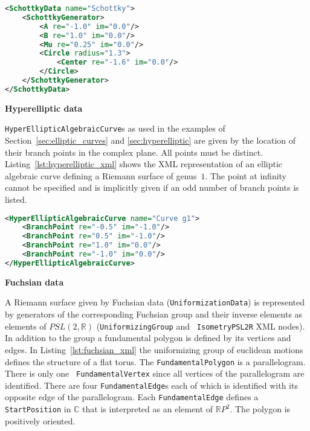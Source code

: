 \documentclass[Thesis.tex]{subfiles}
\begin{document}
\begin{lstlisting}[label=lst:schottky_xml, caption={A torus given by Schottky data}, 
numbers=none, language=XML, captionpos=b]
<SchottkyData name="Schottky">
	<SchottkyGenerator>
		<A re="-1.0" im="0.0"/>
		<B re="1.0" im="0.0"/>
		<Mu re="0.25" im="0.0"/>
		<Circle radius="1.3">
			<Center re="-1.6" im="0.0"/>
		</Circle>
	</SchottkyGenerator>
</SchottkyData>
\end{lstlisting}

{\bf Hyperelliptic data} 

{\tt HyperEllipticAlgebraicCurve}s as used in the examples of
Section~\ref{sec:elliptic_curves} and \ref{sec:hyperelliptic} are
given by the location of their branch points in the complex plane. All points
must be distinct. Listing~\ref{lst:hyperelliptic_xml} shows the XML
representation of an elliptic algebraic curve defining a Riemann surface of
genus~$1$. The point at infinity cannot be specified and is implicitly given if
an odd number of branch points is listed.

\begin{lstlisting}[label=lst:hyperelliptic_xml, caption={A torus given as 
hyperelliptic data}, numbers=none, language=XML, captionpos=b]
<HyperEllipticAlgebraicCurve name="Curve g1">
	<BranchPoint re="-0.5" im="-1.0"/>
	<BranchPoint re="0.5" im="-1.0"/>
	<BranchPoint re="1.0" im="0.0"/>
	<BranchPoint re="-1.0" im="0.0"/>
</HyperEllipticAlgebraicCurve>
\end{lstlisting}

{\bf Fuchsian data}

A Riemann surface given by Fuchsian data ({\tt UniformizationData}) is
represented by generators of the corresponding Fuchsian group and their inverse
elements as elements of $PSL(2,\mathbb R)$ ({\tt UniformizingGroup} and {\tt
IsometryPSL2R} XML nodes). In addition to the group a fundamental polygon is
defined by its vertices and edges. In Listing~\ref{lst:fuchsian_xml} the
uniformizing group of euclidean motions defines the structure of a flat torus.
The {\tt FundamentalPolygon} is a parallelogram. There is only one {\tt
FundamentalVertex} since all vertices of the parallelogram are identified.
There are four {\tt FundamentalEdge}s each of which is identified with its
opposite edge of the parallelogram. Each {\tt FundamentalEdge} defines a {\tt
StartPosition} in $\mathbb C$ that is interpreted as an element of $\mathbb R
P^2$. The polygon is positively oriented.
\end{document}
